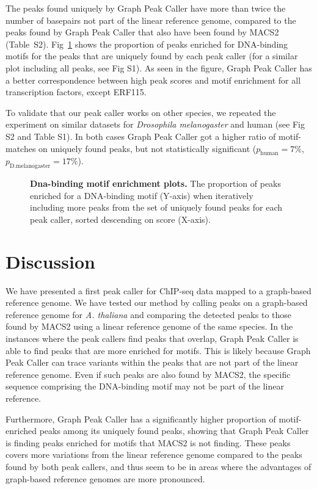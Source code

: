 \documentclass[10pt,letterpaper]{article}
\begin{document}
The peaks found uniquely by Graph Peak Caller have more than twice the number of basepairs not part of the linear reference genome, compared to the peaks found by Graph Peak Caller that also have been found by MACS2 (Table~S2). Fig~\ref{motif_plots} shows the proportion of peaks enriched for DNA-binding motifs for the peaks that are uniquely found by each peak caller (for a similar plot including all peaks, see Fig S1). As seen in the figure, Graph Peak Caller has a better correspondence between high peak scores and motif enrichment for all transcription factors, except ERF115. 


To validate that our peak caller works on other species, we repeated the experiment on similar datasets for \emph{Drosophila melanogaster } and human (see Fig S2 and Table S1). In both cases Graph Peak Caller got a higher ratio of motif-matches on uniquely found peaks, but not statistically significant ($p_{\text{human}}=7\%$, $p_{\text{D.melanogaster}}=17\%$).


\begin{figure}[!h]
 \caption{{\bf Dna-binding motif enrichment plots.} The proportion of peaks enriched for a DNA-binding motif (Y-axis) when iteratively including more peaks from the set of uniquely found peaks for each peak caller, sorted descending on score (X-axis). }
\label{motif_plots}
\end{figure}



\section*{Discussion}
We have presented a first peak caller for ChIP-seq data mapped to a graph-based reference genome. We have tested our method by calling peaks on a graph-based reference genome for \emph{A. thaliana} and comparing the detected peaks to those found by MACS2 using a linear reference genome of the same species. In the instances where the peak callers find peaks that overlap, Graph Peak Caller is able to find peaks that are more enriched for motifs. This is likely because Graph Peak Caller can trace variants within the peaks that are not part of the linear reference genome. Even if such peaks are also found by MACS2, the specific sequence comprising the DNA-binding motif may not be part of the linear reference.
	
Furthermore, Graph Peak Caller has a significantly higher proportion of motif-enriched peaks among its uniquely found peaks, showing that Graph Peak Caller is finding peaks enriched for motifs that MACS2 is not finding.
These peaks covers more variations from the linear reference genome compared to the peaks found by both peak callers, and thus seem to be in areas where the advantages of graph-based reference genomes are more pronounced. 
\end{document}
